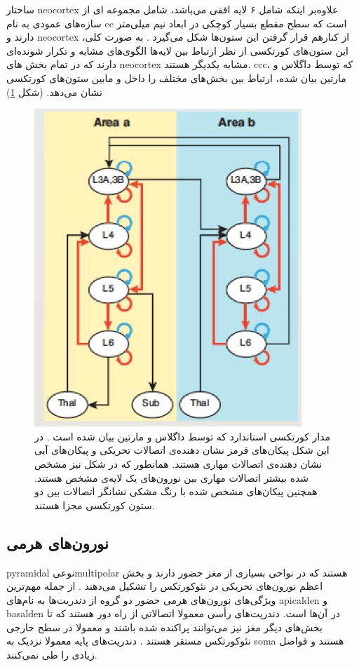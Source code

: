 \documentclass[12pt]{report}
\begin{document}
	ساختار \gls{neocortex} علاوه‌بر اینکه شامل ۶ لایه افقی می‌باشد، شامل مجموعه ای از سازه‌های عمودی به نام \gls{cc} است که سطح مقطع بسیار کوچکی در ابعاد نیم میلی‌متر دارند و \gls{neocortex} از کنار‌هم قرار گرفتن این ستون‌ها شکل می‌گیرد
	\cite{Horton2005}.
	به صورت کلی، این ستون‌های کورتکسی از نظر ارتباط بین لایه‌ها الگوی‌های مشابه و تکرار شونده‌ای دارند که در تمام بخش های \gls{neocortex} مشابه یکدیگر هستند. \gls{ccc}، که توسط داگلاس و مارتین 
	\cite{Douglas2004}
	بیان شده، ارتباط بین بخش‌های مختلف را داخل و مابین ستون‌های کورتکسی نشان می‌دهد.
	(شکل \ref{fig:cc-doganmart})
	
	\begin{figure}[H]
		\centering
		\includegraphics[width=0.5\linewidth]{cc-con.jpg}
		\caption[NS]{
			مدار کورتکسی استاندارد که توسط داگلاس و مارتین بیان شده است
			\cite{Douglas2004}.
			در این شکل پیکان‌های قرمز نشان دهنده‌ی اتصالات تحریکی و پیکان‌های آبی نشان دهنده‌ی اتصالات مهاری هستند. همانطور که در شکل نیز مشخص شده بیشتر اتصالات مهاری بین نورون‌های یک لایه‌ی مشخص هستند. همچنین پیکان‌های مشخص شده با رنگ مشکی نشانگر اتصالات بین دو ستون کورتکسی مجزا هستند.
		}
		\label{fig:cc-doganmart}
	\end{figure}
	
	
	\subsection{نورون‌های هرمی}
	
	\gls{pyramidal} نوعی\gls{multipolar} هستند که در نواحی بسیاری از مغز حضور دارند و بخش اعظم نورون‌های تحریکی در نئوکورتکس را تشکیل می‌دهند \cite{Hawkins2016}.
	از جمله مهم‌ترین ویژگی‌های نورون‌های هرمی حضور دو گروه از دندریت‌ها به نام‌های \gls{apicalden} و \gls{basalden} در آن‌ها است.
	دندریت‌های رأسی معمولا اتصالاتی از راه دور هستند که تا بخش‌های دیگر مغز نیز می‌توانند پراکنده شده باشند و معمولا در سطح خارجی نئوکورتکس مستقر هستند \cite{MEGIAS2001527}. دندریت‌‌های پایه معمولا نزدیک به \gls{soma} هستند و فواصل زیادی را طی نمی‌کنند.
	
\end{document}
